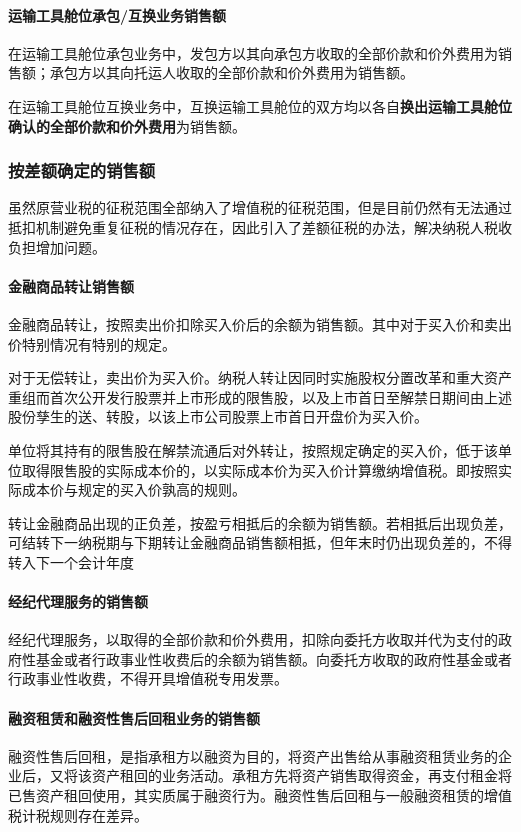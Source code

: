 \documentclass[UTF8,12pt]{ctexart}
\numberwithin{equation}{section} %
\numberwithin{figure}{section}
\numberwithin{table}{section}
\begin{document}
	\paragraph{运输工具舱位承包/互换业务销售额}
	在运输工具舱位承包业务中，发包方以其向承包方收取的全部价款和价外费用为销售额；承包方以其向托运人收取的全部价款和价外费用为销售额。
	
	在运输工具舱位互换业务中，互换运输工具舱位的双方均以各自\textbf{换出运输工具舱位确认的全部价款和价外费用}为销售额。
	
	\subsubsection{按差额确定的销售额}
	虽然原营业税的征税范围全部纳入了增值税的征税范围，但是目前仍然有无法通过抵扣机制避免重复征税的情况存在，因此引入了差额征税的办法，解决纳税人税收负担增加问题。
	
	\paragraph{金融商品转让销售额}
	金融商品转让，按照卖出价扣除买入价后的余额为销售额。其中对于买入价和卖出价特别情况有特别的规定。
	
	对于无偿转让，卖出价为买入价。纳税人转让因同时实施股权分置改革和重大资产重组而首次公开发行股票并上市形成的限售股，以及上市首日至解禁日期间由上述股份孳生的送、转股，以该上市公司股票上市首日开盘价为买入价。
	
	单位将其持有的限售股在解禁流通后对外转让，按照规定确定的买入价，低于该单位取得限售股的实际成本价的，以实际成本价为买入价计算缴纳增值税。即按照实际成本价与规定的买入价孰高的规则。
	
	转让金融商品出现的正负差，按盈亏相抵后的余额为销售额。若相抵后出现负差，可结转下一纳税期与下期转让金融商品销售额相抵，但年末时仍出现负差的，不得转入下一个会计年度
	
	\paragraph{经纪代理服务的销售额}
	经纪代理服务，以取得的全部价款和价外费用，扣除向委托方收取并代为支付的政府性基金或者行政事业性收费后的余额为销售额。向委托方收取的政府性基金或者行政事业性收费，不得开具增值税专用发票。
	
	\paragraph{融资租赁和融资性售后回租业务的销售额}
	融资性售后回租，是指承租方以融资为目的，将资产出售给从事融资租赁业务的企业后，又将该资产租回的业务活动。承租方先将资产销售取得资金，再支付租金将已售资产租回使用，其实质属于融资行为。融资性售后回租与一般融资租赁的增值税计税规则存在差异。
	
\end{document}
